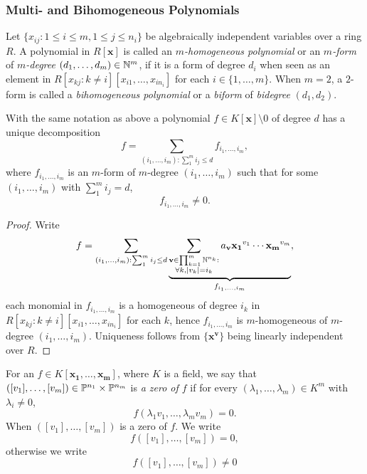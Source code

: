 \subsubsection{Multi- and Bihomogeneous Polynomials}
    \begin{definition}
        Let $\{x_{ij} : 1\leq i\leq m, 1\leq j \leq n_i\}$ be algebraically independent variables over a ring $R$. A polynomial in $R[\mathbf{x}]$ is called an \emph{$m$-homogeneous polynomial} or an \textit{$m$-form} of \textit{$m$-degree} $(d_1,\dots,d_m)\in \mathbb{N}^m$, if it is a form of degree $d_i$ when seen as an element in $R[x_{kj} : k\neq i][x_{i1},\dots,x_{in_i}]$ for each $i\in\{1,\dots,m\}$. When $m=2$, a $2$-form is called a \textit{bihomogeneous polynomial} or a \textit{biform} of \textit{bidegree} $(d_1,d_2)$.
    \end{definition}
    \begin{lemma}
        With the same notation as above a polynomial $f \in K[\mathbf{x}]\setminus 0$ of degree $d$ has a unique decomposition
        $$f = \sum_{(i_1,\dots,i_m): \sum_1^m i_j \leq d} f_{i_1,\dots,i_m},$$
        where $f_{i_1,\dots,i_m}$ is an $m$-form of $m$-degree $(i_1,\dots,i_m)$ such that for some $(i_1,\dots,i_m)$ with $\sum_1^m i_j = d$, 
        $$f_{i_1,\dots,i_m}\neq 0.$$ 
    \end{lemma}
    \begin{proof}
        Write 
        $$f = \sum_{\substack{(i_1,\dots,i_m):\sum_1^m i_j\leq d}} 
        \underbrace{\sum_{\substack{\mathbf{v}\in\prod_{k=1}^m \mathbb{N}^{n_k} :\\ \forall k, \vert v_k\vert = i_k}} a_\mathbf{v} \mathbf{x_1}^{v_1}\cdots \mathbf{x_m}^{v_m}}_{f_{i_1,\dots,i_m}},$$
        each monomial in $f_{i_1,\dots,i_m}$ is a homogeneous of degree $i_k$ in $R[x_{kj} : k\neq i][x_{i1},\dots,x_{in_i}]$ for each $k$, hence $f_{i_1,\dots,i_m}$ is $m$-homogeneous of $m$-degree $(i_1,\dots,i_m)$. Uniqueness follows from $\{\mathbf{x}^\mathbf{v}\}$ being linearly independent over $R$.
    \end{proof}
    \begin{definition}
        For an $f\in K[\mathbf{x_1},\dots,\mathbf{x_m}]$, where $K$ is a field, we say that $([v_1],\dots,[v_m])\in \mathbb{P}^{n_1}\times \mathbb{P}^{n_m}$ is \textit{a zero of $f$} if for every $(\lambda_1,\dots,\lambda_m)\in K^m$ with $\lambda_i\neq 0$, 
        $$
            f(\lambda_1v_1,\dots,\lambda_mv_m) = 0.
        $$
        When $([v_1],\dots,[v_m])$ is a zero of $f$. We write 
        $$
            f([v_1],\dots,[v_m]) = 0,
        $$
        otherwise we write 
        $$
            f([v_1],\dots,[v_m]) \neq 0
        $$
    \end{definition}
